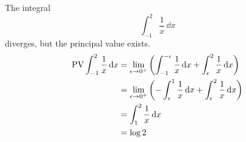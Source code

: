 \begin{Example}
  The integral
  \[ \int_{-1}^2 \frac{1}{x}\,\dd x \]
  diverges, but the principal value exists.
  \begin{align*}
    \mathop{\mathrm{PV}}\nolimits \int_{-1}^2 \frac{1}{x}\,\mathrm{d} x
    &= \lim_{\epsilon \to 0^+} \left( \int_{-1}^{-\epsilon} \frac{1}{x}\,\mathrm{d} x
      + \int_\epsilon^2 \frac{1}{x}\,\mathrm{d} x \right) \\
    &= \lim_{\epsilon \to 0^+} \left( -\int_\epsilon^1 \frac{1}{x}\,\mathrm{d} x
      + \int_\epsilon^2 \frac{1}{x}\,\mathrm{d} x \right) \\
    &= \int_1^2 \frac{1}{x}\,\mathrm{d} x  \\
    &= \log 2
  \end{align*}
\end{Example}



















